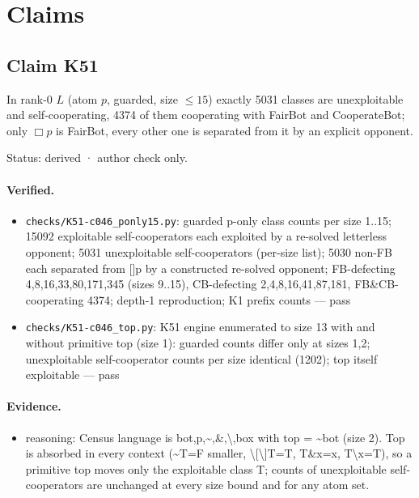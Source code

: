 \documentclass{article}
\begin{document}
\section{Claims}

\subsection*{Claim K51}

In rank-0 $L$ (atom $p$, guarded, size $\le15$) exactly 5031 classes are unexploitable and self-cooperating, 4374 of them cooperating with FairBot and CooperateBot; only $\Box p$ is FairBot, every other one is separated from it by an explicit opponent.

Status: derived · author check only.

\paragraph{Verified.}
\begin{itemize}
\item \texttt{checks/K51-c046\_ponly15.py}: guarded p-only class counts per size 1..15; 15092 exploitable self-cooperators each exploited by a re-solved letterless opponent; 5031 unexploitable self-cooperators (per-size list); 5030 non-FB each separated from []p by a constructed re-solved opponent; FB-defecting 4,8,16,33,80,171,345 (sizes 9..15), CB-defecting 2,4,8,16,41,87,181, FB\&CB-cooperating 4374; depth-1 reproduction; K1 prefix counts --- pass
\item \texttt{checks/K51-c046\_top.py}: K51 engine enumerated to size 13 with and without primitive top (size 1): guarded counts differ only at sizes 1,2; unexploitable self-cooperator counts per size identical (1202); top itself exploitable --- pass
\end{itemize}

\paragraph{Evidence.}
\begin{itemize}
\item reasoning: Census language is bot,p,\textasciitilde{},\&,\textbackslash{}\textbar{},box with top = \textasciitilde{}bot (size 2). Top is absorbed in every context (\textasciitilde{}T=F smaller, \textbackslash{}[\textbackslash{}]T=T, T\&x=x, T\textbackslash{}\textbar{}x=T), so a primitive top moves only the exploitable class T; counts of unexploitable self-cooperators are unchanged at every size bound and for any atom set.
\end{itemize}
\end{document}
